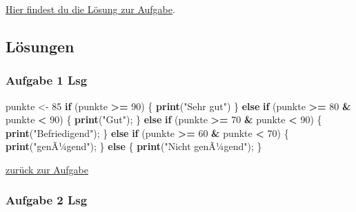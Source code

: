 \documentclass[]{article}
\newenvironment{Shaded}{\begin{snugshade}}{\end{snugshade}}
\newcommand{\KeywordTok}[1]{\textcolor[rgb]{0.13,0.29,0.53}{\textbf{#1}}}
\newcommand{\DecValTok}[1]{\textcolor[rgb]{0.00,0.00,0.81}{#1}}
\newcommand{\StringTok}[1]{\textcolor[rgb]{0.31,0.60,0.02}{#1}}
\newcommand{\ControlFlowTok}[1]{\textcolor[rgb]{0.13,0.29,0.53}{\textbf{#1}}}
\newcommand{\OperatorTok}[1]{\textcolor[rgb]{0.81,0.36,0.00}{\textbf{#1}}}
\newcommand{\NormalTok}[1]{#1}
\begin{document}
\protect\hyperlink{aufgabe-2-lsg}{Hier findest du die Lösung zur
Aufgabe}.

\subsection*{Lösungen}\label{losungen-4}

\hypertarget{aufgabe-1-lsg}{\subsubsection*{Aufgabe 1
Lsg}\label{aufgabe-1-lsg}}

\begin{Shaded}
\begin{Highlighting}[]
\NormalTok{  punkte <-}\StringTok{ }\DecValTok{85}
  \ControlFlowTok{if}\NormalTok{ (punkte }\OperatorTok{>=}\StringTok{ }\DecValTok{90}\NormalTok{) \{}
    \KeywordTok{print}\NormalTok{(}\StringTok{"Sehr gut"}\NormalTok{)}
\NormalTok{  \} }\ControlFlowTok{else} \ControlFlowTok{if}\NormalTok{ (punkte }\OperatorTok{>=}\StringTok{ }\DecValTok{80} \OperatorTok{&}\StringTok{ }\NormalTok{punkte }\OperatorTok{<}\StringTok{ }\DecValTok{90}\NormalTok{) \{}
    \KeywordTok{print}\NormalTok{(}\StringTok{"Gut"}\NormalTok{);    }
\NormalTok{  \} }\ControlFlowTok{else} \ControlFlowTok{if}\NormalTok{ (punkte }\OperatorTok{>=}\StringTok{ }\DecValTok{70} \OperatorTok{&}\StringTok{ }\NormalTok{punkte }\OperatorTok{<}\StringTok{ }\DecValTok{90}\NormalTok{) \{}
    \KeywordTok{print}\NormalTok{(}\StringTok{"Befriedigend"}\NormalTok{);    }
\NormalTok{  \} }\ControlFlowTok{else} \ControlFlowTok{if}\NormalTok{ (punkte }\OperatorTok{>=}\StringTok{ }\DecValTok{60} \OperatorTok{&}\StringTok{ }\NormalTok{punkte }\OperatorTok{<}\StringTok{ }\DecValTok{70}\NormalTok{) \{}
    \KeywordTok{print}\NormalTok{(}\StringTok{"genÃ¼gend"}\NormalTok{);    }
\NormalTok{  \} }\ControlFlowTok{else}\NormalTok{ \{}
    \KeywordTok{print}\NormalTok{(}\StringTok{"Nicht genÃ¼gend"}\NormalTok{);    }
\NormalTok{  \}}
\end{Highlighting}
\end{Shaded}

\protect\hyperlink{aufgabe-1}{zurück zur Aufgabe}

\hypertarget{aufgabe-2-lsg}{\subsubsection*{Aufgabe 2
Lsg}\label{aufgabe-2-lsg}}
\end{document}
